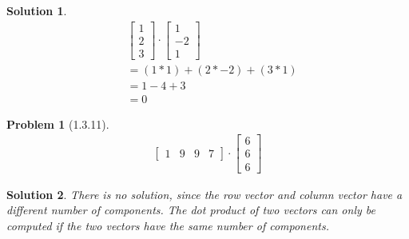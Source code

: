 \documentclass{article}
\newtheorem{problem}{Problem}
\newtheorem*{solution}{Solution}
\begin{document}
\begin{solution}
\begin{align*}
&\begin{bmatrix}
1 \\ 2 \\ 3
\end{bmatrix}
\cdot
\begin{bmatrix}
1 \\ -2 \\ 1
\end{bmatrix} \\
&= (1 * 1) + (2 * -2) + (3 * 1) \\
&=1 - 4 + 3 \\
&= 0
\end{align*}

\end{solution}

\begin{problem}[1.3.11]
\begin{align*}
\begin{bmatrix}
1 & 9 & 9 & 7
\end{bmatrix}
\cdot
\begin{bmatrix}
6 \\ 6 \\ 6
\end{bmatrix}
\end{align*}
\end{problem}

\begin{solution}
There is no solution, since the row vector and column vector have a different number of components. The dot product of two vectors can only be computed if the two vectors have the same number of components.
\end{solution}
\end{document}
